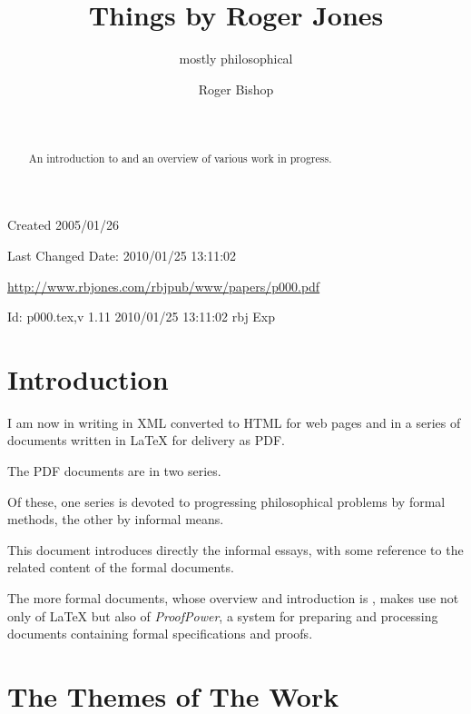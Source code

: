\documentclass[numreferences]{rbjk}
\begin{document}
                                                                                   
\begin{article}
\begin{opening}  
\title{Things by Roger Jones}
\subtitle{mostly philosophical}
\author{Roger Bishop }
\date{\ }

\begin{abstract}
An introduction to and an overview of various work in progress.
\end{abstract}
\end{opening}

\vfill

\begin{centering}
{\footnotesize
Created 2005/01/26

Last Changed $ $Date: 2010/01/25 13:11:02 $ $

\href{http://www.rbjones.com/rbjpub/www/papers/p000.pdf}
{http://www.rbjones.com/rbjpub/www/papers/p000.pdf}

$ $Id: p000.tex,v 1.11 2010/01/25 13:11:02 rbj Exp $ $

}%
\end{centering}

\newpage

\setcounter{tocdepth}{4}
{\parskip=0pt\tableofcontents}

\section{Introduction}

I am now in writing in XML converted to HTML for web pages and in a
series of documents written in LaTeX for delivery as PDF.

The PDF documents are in two series.

Of these, one series is devoted to progressing philosophical problems
by formal methods, the other by informal means.

This document introduces directly the informal essays, with some
reference to the related content of the formal documents.

The more formal documents, whose overview and introduction is \cite{rbjt000}, makes use not only of {\LaTeX} but also of {\it ProofPower}, a system for preparing and processing documents containing formal specifications and proofs.

\section{The Themes of The Work}


\end{article}
\end{document}

